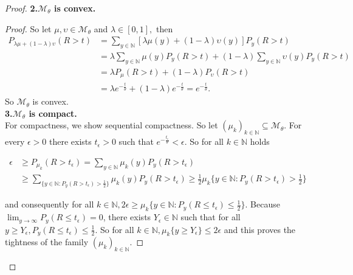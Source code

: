 \documentclass[12pt,a4paper]{scrartcl}
\numberwithin{equation}{section}
\newcommand{\N}{\mathbb{N}} %
\begin{document}
\begin{proof}
\textbf{2.$\mathcal{M}_{\theta}$ is convex.}\\
\begin{proof}
So let $\mu, \upsilon \in \mathcal{M}_{\theta}$ and $\lambda \in \left[0,1\right],$ then
\begin{align*}
P_{\lambda \mu +\left(1-\lambda\right)\upsilon}\left(R > t\right) &= \sum_{y \in \N} \left[\lambda \mu\left(y\right) + \left(1-\lambda\right) \upsilon\left(y\right) \right] P_y\left(R > t\right) \\
&=\lambda \sum_{y \in \N} \mu\left(y\right) P_y\left(R > t\right) + \left(1- \lambda\right) \sum_{y \in \N} \upsilon\left(y\right) P_y\left(R > t\right) \\
&= \lambda P_{\mu}\left(R > t\right) + \left(1-\lambda\right) P_{\upsilon}\left(R > t\right) \\
&=\lambda e^{-\frac{t}{\theta}} + \left(1-\lambda\right) e^{-\frac{t}{\theta}} = e^{-\frac{t}{\theta}}.
\end{align*}
So $\mathcal{M}_{\theta}$ is convex. \\[2ex]


\textbf{3.$\mathcal{M}_{\theta}$ is compact.}\\

For compactness, we show sequential compactness. So let $ \left(\mu_k\right)_{k \in \N} \subseteq \mathcal{M}_{\theta} $. For every $\epsilon > 0$ there exists $t_{\epsilon} > 0$ such that $e^{-\frac{t_{\epsilon}}{\theta}} < \epsilon.$ So for all $k \in \N$ holds 

\begin{align*}
\epsilon &\geq P_{\mu_k}\left(R > t_{\epsilon}\right) = \sum_{y \in \N} \mu_k\left(y\right) P_y\left(R > t_{\epsilon}\right) \\
&\geq \sum_{\lbrace y \in \N : P_y\left(R > t_{\epsilon}\right) > \frac{1}{2}\rbrace } \mu_k\left(y\right) P_y\left(R > t_{\epsilon}\right) \geq \frac{1}{2} \mu_k\lbrace y \in \N : P_y\left(R > t_{\epsilon}\right) > \frac{1}{2}\rbrace 
\end{align*}

and consequently for all $k \in \N, 2\epsilon \geq \mu_k\lbrace y \in \N : P_y\left(R \leq t_{\epsilon}\right) \leq \frac{1}{2}\rbrace $. Because $\lim_{y \to \infty} P_y\left(R \leq t_{\epsilon}\right) = 0$, there exists $Y_{\epsilon} \in \N$ such that for all $ y \geq Y_{\epsilon}, P_y\left(R \leq t_{\epsilon}\right) \leq \frac{1}{2}$. So for all $ k \in \N, \mu_k\lbrace y \geq Y_{\epsilon} \rbrace  \leq 2 \epsilon $ and this proves the tightness of the family $\left(\mu_k\right)_{k \in \N}.$


\end{proof}
\end{proof}
\end{document}
